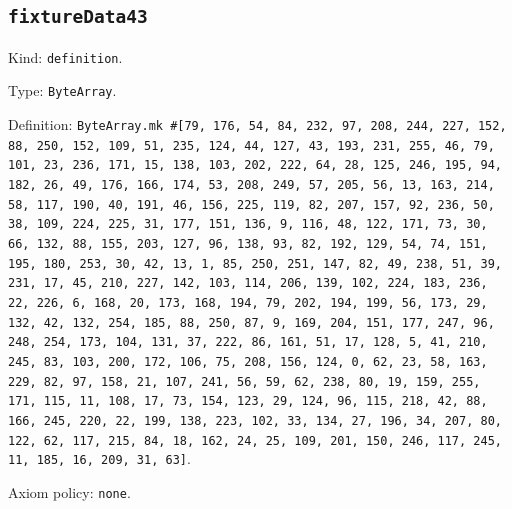 \documentclass[11pt]{article}
\begin{document}
\subsection*{\texttt{fixtureData43}}
\noindent Kind: \texttt{definition}.\par
\noindent Type: \texttt{ByteArray}.\par
\noindent Definition: \texttt{ByteArray.mk \#[79, 176, 54, 84, 232, 97, 208, 244, 227, 152, 88, 250, 152, 109, 51, 235, 124, 44, 127, 43, 193, 231, 255, 46, 79, 101, 23, 236, 171, 15, 138, 103, 202, 222, 64, 28, 125, 246, 195, 94, 182, 26, 49, 176, 166, 174, 53, 208, 249, 57, 205, 56, 13, 163, 214, 58, 117, 190, 40, 191, 46, 156, 225, 119, 82, 207, 157, 92, 236, 50, 38, 109, 224, 225, 31, 177, 151, 136, 9, 116, 48, 122, 171, 73, 30, 66, 132, 88, 155, 203, 127, 96, 138, 93, 82, 192, 129, 54, 74, 151, 195, 180, 253, 30, 42, 13, 1, 85, 250, 251, 147, 82, 49, 238, 51, 39, 231, 17, 45, 210, 227, 142, 103, 114, 206, 139, 102, 224, 183, 236, 22, 226, 6, 168, 20, 173, 168, 194, 79, 202, 194, 199, 56, 173, 29, 132, 42, 132, 254, 185, 88, 250, 87, 9, 169, 204, 151, 177, 247, 96, 248, 254, 173, 104, 131, 37, 222, 86, 161, 51, 17, 128, 5, 41, 210, 245, 83, 103, 200, 172, 106, 75, 208, 156, 124, 0, 62, 23, 58, 163, 229, 82, 97, 158, 21, 107, 241, 56, 59, 62, 238, 80, 19, 159, 255, 171, 115, 11, 108, 17, 73, 154, 123, 29, 124, 96, 115, 218, 42, 88, 166, 245, 220, 22, 199, 138, 223, 102, 33, 134, 27, 196, 34, 207, 80, 122, 62, 117, 215, 84, 18, 162, 24, 25, 109, 201, 150, 246, 117, 245, 11, 185, 16, 209, 31, 63]}.\par
\noindent Axiom policy: \texttt{none}.\par
\end{document}
